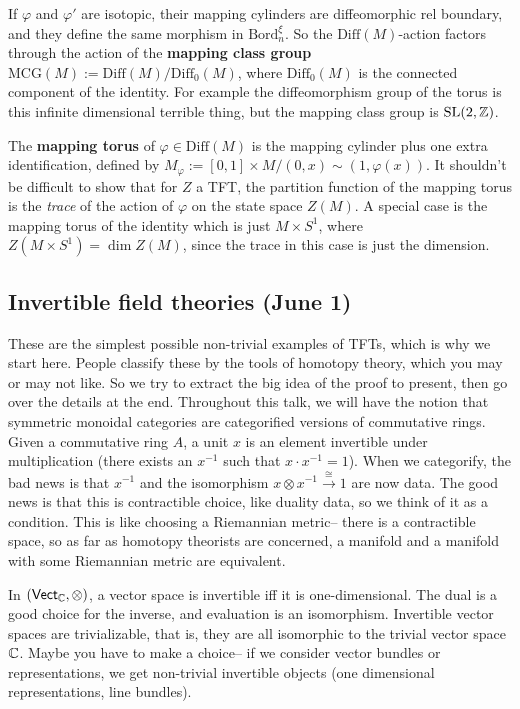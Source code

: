 If $\varphi $ and $\varphi '$ are isotopic, their mapping cylinders are diffeomorphic rel boundary, and they define the same morphism in $\mathrm{Bord}_n ^{\xi}$. So the $\mathrm{Diff}(M)$-action factors through the action of the \textbf{mapping class group} $\mathrm{MCG}(M):=\mathrm{Diff}(M) / \mathrm{Diff}_0(M)$, where $\mathrm{Diff}_0(M)$ is the connected component of the identity. For example the diffeomorphism group of the torus is this infinite dimensional terrible thing, but the mapping class group is $\mathrm{SL}(2,\mathbb{Z})$.

The \textbf{mapping torus} of $\varphi  \in \mathrm{Diff}(M)$ is the mapping cylinder plus one extra identification, defined by $M_{\varphi }:= [0,1] \times M / (0,x) \sim (1, \varphi (x))$. It shouldn't be difficult to show that for $Z$ a TFT, the partition function of the mapping torus is the \emph{trace} of the action of $\varphi $ on the state space $Z(M)$. A special case is the mapping torus of the identity which is just $M \times S^1 $, where $Z(M \times S^1 )=\dim Z(M)$, since the trace in this case is just the dimension.

\subsection{Invertible field theories (June 1)}
These are the simplest possible non-trivial examples of TFTs, which is why we start here. People classify these by the tools of homotopy theory, which you may or may not like. So we try to extract the big idea of the proof to present, then go over the details at the end.
\orbreak
Throughout this talk, we will have the notion that symmetric monoidal categories are categorified versions of commutative rings. Given a commutative ring $A$, a unit $x$ is an element invertible under multiplication (there exists an $x^{-1}$ such that $x \cdot  x^{-1}=1$). When we categorify, the bad news is that $x ^{-1}$ and the isomorphism $x \otimes x ^{-1} \xrightarrow{\cong} 1$ are now data. The good news is that this is contractible choice, like duality data, so we think of it as a condition. This is like choosing a Riemannian metric-- there is a contractible space, so as far as homotopy theorists are concerned, a manifold and a manifold with some Riemannian metric are equivalent.
\begin{example}
    In $(\mathsf{Vect} _{\mathbb{C}}, \otimes)$, a vector space is invertible iff it is one-dimensional. The dual is a good choice for the inverse, and evaluation is an isomorphism. Invertible vector spaces are trivializable, that is, they are all isomorphic to the trivial vector space $\mathbb{C}$. Maybe you have to make a choice-- if we consider vector bundles or representations, we get non-trivial invertible objects (one dimensional representations, line bundles).
\end{example}

